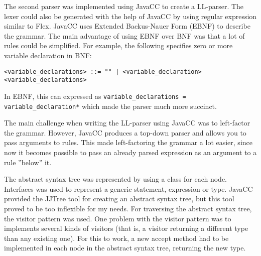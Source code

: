 \documentclass[11pt,oneside,a4paper]{article}
\begin{document}
The second parser was implemented using JavaCC to create a LL-parser. The lexer
could also be generated with the help of JavaCC by using regular expression
similar to Flex. JavaCC uses Extended Backus-Nauer Form (EBNF) to describe the
grammar. The main advantage of using EBNF over BNF was that a lot of rules
could be simplified. For example, the following specifies zero or more variable
declaration in BNF:
\begin{verbatim}
<variable_declarations> ::= "" | <variable_declaration> <variable_declarations>
\end{verbatim}
In EBNF, this can expressed as 
\verb|variable_declarations = variable_declaration*| which made the parser much 
more succinct.

The main challenge when writing the LL-parser using JavaCC was to left-factor
the grammar. However, JavaCC produces a top-down parser and allows you to
pass arguments to rules. This made left-factoring the grammar  a lot easier, 
since now it becomes possible to pass an already parsed expression as an 
argument to a rule ''below'' it.

The abstract syntax tree was represented by using a class for each node.
Interfaces was used to represent a generic statement, expression or type.
JavaCC provided the JJTree tool for creating an abstract syntax tree, but this
tool proved to be too inflexible for my needs. For traversing the abstract
syntax tree, the visitor pattern was used. One problem with the visitor pattern
was to implements several kinds of visitors (that is, a visitor returning a
different type than any existing one). For this to work, a new accept method
had to be implemented in each node in the abstract syntax tree, returning the
new type.
\end{document}
